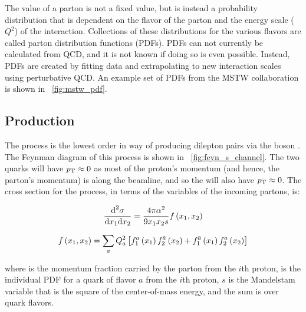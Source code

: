 The  value of a parton is not a fixed value, but is instead a
probability distribution that is dependent on the flavor of the parton and the
energy scale ($Q^{2}$) of the interaction. Collections of these distributions
for the various flavors are called parton distribution functions (PDFs). PDFs
can not currently be calculated from QCD, and it is not known if doing so is
even possible. Instead, PDFs are created by fitting data and extrapolating to
new interaction scales using perturbative QCD. An example set of PDFs from the
MSTW collaboration\cite{martin_2009} is shown in \FIG~\ref{fig:mstw_pdf}.



\subsection{\DrellYan Production}
\label{ssec:dy_production}

The \DrellYan process is the lowest order in \alphastrong way of producing
dilepton pairs via the \Z boson \cite{drell_1970}\cite{drell_1970a}. The
Feynman diagram of this process is shown in \FIG~\ref{fig:feyn_s_channel}. The
two quarks will have $p_{\mathrm{T}} \approx 0$ as most of the proton's momentum (and
hence, the parton's momentum) is along the beamline, and so the \Z will also
have $p_{\mathrm{T}} \approx 0$. The cross section for the \DrellYan process, in terms of
the  variables of the incoming partons, is:

\begin{equation}\label{eq:drell_yan_cross_section}
    \frac{\text{d}^{2}\sigma}
    {\text{d}x_{1} \text{d}x_{2}}
    =
    \frac{4 \pi \alpha^{2}}
    {9 x_{1} x_{2} s}
    f \left( x_{1}, x_{2} \right)
\end{equation}

\begin{equation}\label{eq:fx}
    f \left( x_{1}, x_{2} \right)
    =
    \sum_{a}
    Q^{2}_{a}
    \left[
        f^{a}_{1} \left( x_{1} \right)
        f^{\bar{a}}_{2} \left( x_{2} \right)
        +
        f^{\bar{a}}_{1} \left( x_{1} \right)
        f^{a}_{2} \left( x_{2} \right)
    \right]
\end{equation}

where  is the momentum fraction carried by the parton from the
$i$th proton,  is the individual PDF for a quark of
flavor $a$ from the $i$th proton, $s$ is the Mandelstam variable that is
the square of the center-of-mass energy, and the sum is over quark flavors.

